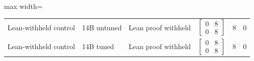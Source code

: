 \begin{table}[htbp]
\begin{adjustbox}{max width=\textwidth}
\begin{tabular}{lllcrr}
Lean-withheld control & 14B untuned & Lean proof withheld & $\left[\begin{smallmatrix}0&8\\0&8\end{smallmatrix}\right]$ & 8 & 0 \\
Lean-withheld control & 14B tuned & Lean proof withheld & $\left[\begin{smallmatrix}0&8\\0&8\end{smallmatrix}\right]$ & 8 & 0 \\
\bottomrule
\end{tabular}
\end{adjustbox}
\end{table}
